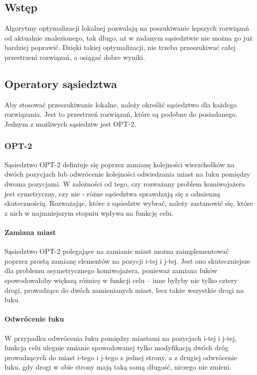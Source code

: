 \subsection{Wstęp}

Algorytmy optymalizacji lokalnej pozwalają na poszukiwanie lepszych rozwiązań od aktualnie znalezionego, tak długo, aż w zadanym sąsiedztwie nie można go już bardziej poprawić. Dzięki takiej optymalizacji, nie trzeba przeszukiwać całej przestrzeni rozwiązań, a osiągać dobre wyniki. 

\subsection{Operatory sąsiedztwa}

Aby stosować przeszukiwanie lokalne, należy określić sąsiedztwo dla każdego rozwiązania. Jest to przestrzeń rozwiązań, które są podobne do posiadanego. Jednym z możliwych sąsiedztw jest OPT-2.

\subsubsection{OPT-2}

Sąsiedztwo OPT-2 definiuje się poprzez zamianę kolejności wierzchołków na dwóch pozycjach lub odwrócenie kolejności odwiedzania miast na łuku pomiędzy dwoma pozycjami. W zależności od tego, czy rozważany problem komiwojażera jest symetryczny, czy nie - różne sąsiedztwa sprawdzają się z odmienną skutecznością. Rozważając, które z sąsiedztw wybrać, należy zastanowić się, które z nich w najmniejszym stopniu wpływa na funkcję celu.

\paragraph{Zamiana miast}

Sąsiedztwo OPT-2 polegające na zamianie miast można zaimplementować poprzez prostą zamianę elementów na pozycji i-tej i j-tej. Jest ono skuteczniejsze dla problemu asymetrycznego komiwojażera, ponieważ zamiana łuków spowodowałaby większą różnicę w funkcji celu -- inne byłyby nie tylko cztery drogi, prowadzące do dwóch zamienianych miast, lecz także wszystkie drogi na łuku.

\paragraph{Odwrócenie łuku}

W przypadku odwrócenia łuku pomiędzy miastami na pozycjach i-tej i j-tej, funkcja celu ulegnie zmianie spowodowanej tylko modyfikacją dwóch dróg prowadzących do miast i-tego i j-tego z jednej strony, a z drugiej odwrócenie łuku, gdy drogi w obie strony mają taką samą długość, niczego nie zmieni.

